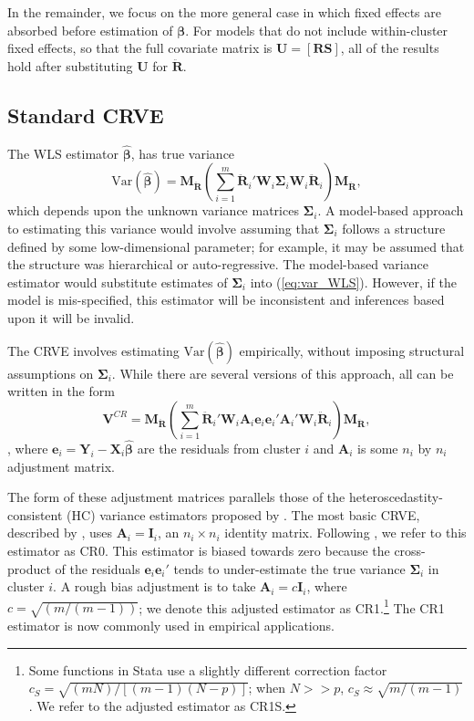 \documentclass[12pt]{article}\usepackage[]{graphicx}\usepackage[]{color}
\newcommand{\Var}{\text{Var}}
\newcommand{\bm}{\mathbf}
\newcommand{\bs}{\boldsymbol}
\begin{document}
In the remainder, we focus on the more general case in which fixed effects are absorbed before estimation of $\bs\beta$. For models that do not include within-cluster fixed effects, so that the full covariate matrix is $\bm{U} = \left[\bm{R} \bm{S}\right]$, all of the results hold after substituting $\bm{U}$ for $\bm{\ddot{R}}$. 

\subsection{Standard CRVE}

The WLS estimator $\bs{\hat\beta}$, has true variance
\begin{equation}
\label{eq:var_WLS}
\Var\left(\bs{\hat\beta}\right) = \bm{M_{\ddot{R}}}\left(\sum_{i=1}^m \bm{\ddot{R}}_i' \bm{W}_i \bs\Sigma_i \bm{W}_i\bm{\ddot{R}}_i\right) \bm{M_{\ddot{R}}},
\end{equation}
which depends upon the unknown variance matrices $\bs\Sigma_i$. 
A model-based approach to estimating this variance would involve assuming that $\bm\Sigma_i$ follows a structure defined by some low-dimensional parameter; for example, it may be assumed that the structure was hierarchical or auto-regressive. 
The model-based variance estimator would substitute estimates of $\bs\Sigma_i$ into (\ref{eq:var_WLS}).
However, if the model is mis-specified, this estimator will be inconsistent and inferences based upon it will be invalid.

The CRVE involves estimating $\Var\left(\bs{\hat\beta}\right)$ empirically, without imposing structural assumptions on $\bs\Sigma_i$. 
While there are several versions of this approach, all can be written in the form
\begin{equation}
\label{eq:V_small}
\bm{V}^{CR} = \bm{M_{\ddot{R}}}\left(\sum_{i=1}^m \bm{\ddot{R}}_i'\bm{W}_i \bm{A}_i \bm{e}_i \bm{e}_i' \bm{A}_i' \bm{W}_i \bm{\ddot{R}}_i\right) \bm{M_{\ddot{R}}},
\end{equation}
, where $\bm{e}_i = \bm{Y}_i - \bm{X}_i \bs{\hat\beta}$ are the residuals from cluster $i$ and $\bm{A}_i$ is some $n_i$ by $n_i$ adjustment matrix. 

The form of these adjustment matrices parallels those of the heteroscedastity-consistent (HC) variance estimators proposed by \citet*{MacKinnon1985some}. 
The most basic CRVE, described by \citet{Liang1986longitudinal}, uses $\bm{A}_i = \bm{I}_i$, an $n_i \times n_i$ identity matrix. 
Following \citet{Cameron2015practitioners}, we refer to this estimator as CR0. 
This estimator is biased towards zero because the cross-product of the residuals $\bm{e}_i \bm{e}_i'$ tends to under-estimate the true variance $\bs\Sigma_i$ in cluster $i$.
A rough bias adjustment is to take $\bm{A}_i = c\bm{I}_i$, where $c = \sqrt{(m/(m-1))}$; we denote this adjusted estimator as CR1.\footnote{Some functions in Stata use a slightly different correction factor $c_S = \sqrt{(m N)/[(m - 1)(N - p)]}$; when $N >> p$, $c_S \approx \sqrt{m/(m-1)}$. We refer to the adjusted estimator as CR1S.}
The CR1 estimator is now commonly used in empirical applications.
\end{document}
